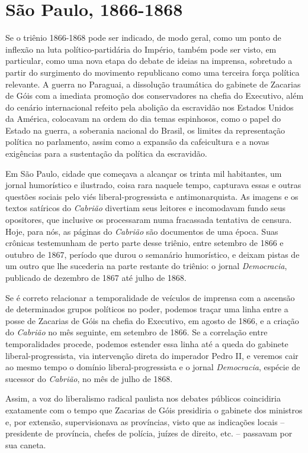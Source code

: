 \section{São Paulo, 1866-1868}

Se o triênio 1866-1868 pode ser indicado, de modo geral, como um ponto
de inflexão na luta político-partidária do Império, também pode ser
visto, em particular, como uma nova etapa do debate de ideias na
imprensa, sobretudo a partir do surgimento do movimento republicano como
uma terceira força política relevante. A guerra no Paraguai, a
dissolução traumática do gabinete de Zacarias de Góis com a imediata
promoção dos conservadores na chefia do Executivo, além do cenário
internacional refeito pela abolição da escravidão nos Estados Unidos da
América, colocavam na ordem do dia temas espinhosos, como o papel do
Estado na guerra, a soberania nacional do Brasil, os limites da
representação política no parlamento, assim como a expansão da
cafeicultura e a novas exigências para a sustentação da política da
escravidão.

Em São Paulo, cidade que começava a alcançar os trinta mil habitantes,
um jornal humorístico e ilustrado, coisa rara naquele tempo, capturava
essas e outras questões sociais pelo viés liberal-progressista e
antimonarquista. As imagens e os textos satíricos do \emph{Cabrião}
divertiam seus leitores e incomodavam fundo seus opositores, que
inclusive os processaram numa fracassada tentativa de censura. Hoje,
para nós, as páginas do \emph{Cabrião} são documentos de uma época. Suas
crônicas testemunham de perto parte desse triênio, entre setembro de
1866 e outubro de 1867, período que durou o semanário humorístico, e
deixam pistas de um outro que lhe sucederia na parte restante do
triênio: o jornal \emph{Democracia}, publicado de dezembro de 1867 até
julho de 1868.

Se é correto relacionar a temporalidade de veículos de imprensa com a
ascensão de determinados grupos políticos no poder, podemos traçar uma
linha entre a posse de Zacarias de Góis na chefia do Executivo, em
agosto de 1866, e a criação do \emph{Cabrião} no mês seguinte, em
setembro de 1866. Se a correlação entre temporalidades procede, podemos
estender essa linha até a queda do gabinete liberal-progressista, via
intervenção direta do imperador Pedro II, e veremos cair ao mesmo tempo
o domínio liberal-progressista e o jornal \emph{Democracia}, espécie de
sucessor do \emph{Cabrião}, no mês de julho de 1868.

Assim, a voz do liberalismo radical paulista nos debates públicos
coincidiria exatamente com o tempo que Zacarias de Góis presidiria o
gabinete dos ministros e, por extensão, supervisionava as províncias,
visto que as indicações locais -- presidente de província, chefes de
polícia, juízes de direito, etc. -- passavam por sua caneta.

